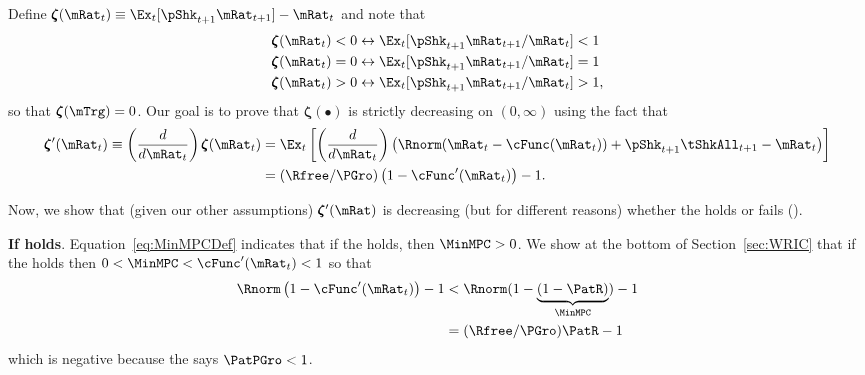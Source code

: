 \documentclass[\econtexRoot/BufferStockTheory]{subfiles}
\begin{document}
Define \providecommand{\difFunc}{\pmb{\zeta}} $\difFunc(\mRat_t) \equiv 
\Ex_t[\pShk_{t+1}\mRat_{t+1}] - \mRat_t$ and note that
\begin{align}\label{eq:difRatioEquiv}
  \difFunc(\mRat_t) < 0 &\leftrightarrow \Ex_t[\pShk_{t+1}\mRat_{t+1}/\mRat_{t}] < 1 
                          \nonumber\\
  \difFunc(\mRat_t) = 0 &\leftrightarrow \Ex_t[\pShk_{t+1}\mRat_{t+1}/\mRat_{t}] = 1\\
  \difFunc(\mRat_t) > 0 &\leftrightarrow \Ex_t[\pShk_{t+1}\mRat_{t+1}/\mRat_{t}] > 
                          1,\nonumber
\end{align}
so that $\difFunc(\mTrg)=0$. Our goal is to prove that $\difFunc(\bullet)$ is strictly 
decreasing on $(0,\infty)$ using the fact that
\begin{align}
  \difFunc^{\prime}(\mRat_{t}) \equiv  \left( \frac{d}{d\mRat_{t}}\right) \difFunc(\mRat_t)  & = \Ex_{t}\left[
                                                                                               \left( \frac{d}{d\mRat_{t}}\right) \left( 
                                                                                               {\Rnorm}(\mRat_{t}-\cFunc(\mRat_{t}))+%
                                                                                               {\pShk}_{t+1}{\tShkAll}_{t+1} - {\mRat}_t\right) \right] \label{eq:difFuncDecreases} \\
                                                                                             & = (\Rfree/\PGro)\left(1-\cFunc^{\prime}({\mRat}_t)\right) - 1.  \notag
\end{align}

Now, we show that (given our other assumptions) $\difFunc^{\prime}(\mRat)$ is decreasing (but for different reasons) whether the {\RIC} holds or fails (\cncl{\RIC}).

\textbf{If {\RIC} holds}. Equation~\eqref{eq:MinMPCDef} indicates that if the {\RIC} holds, then $\MinMPC >0$.  We show at the bottom of Section~\ref{sec:WRIC} that if the {\RIC} holds then $0 < \MinMPC < \cFunc^{\prime}(\mRat_{t}) < 1$ so that 
\begin{align*}
  \Rnorm\left(1-\cFunc^{\prime}({\mRat}_t)\right) - 1 & <  \Rnorm(1-\underbrace{(1-\PatR)}_{\MinMPC}) - 1  \\
                                                      & = (\Rfree/\PGro)\PatR - 1 
\end{align*}
which is negative because the {\GICRaw} says $\PatPGro < 1$.  
\end{document}
